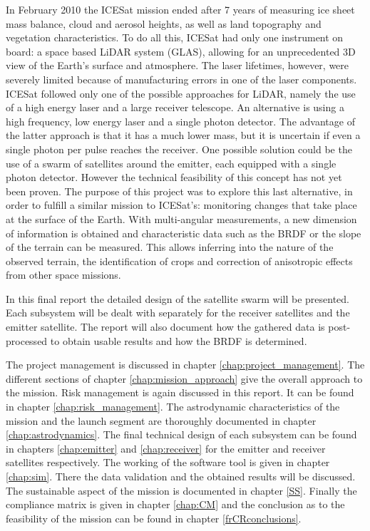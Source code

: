 In February 2010 the ICESat mission ended after 7 years of measuring ice sheet mass balance, cloud and aerosol heights, as well as land topography and vegetation characteristics.
To do all this, ICESat had only one instrument on board: a space based \ac{LiDAR} system (\ac{GLAS}), allowing for an unprecedented 3D view of the Earth's surface and atmosphere.
The laser lifetimes, however, were severely limited because of manufacturing errors in one of the laser components.
ICESat followed only one of the possible approaches for \ac{LiDAR}, namely the use of a high energy laser and a large receiver telescope. An alternative is using a high frequency, low energy laser and a single photon detector. The advantage of the latter approach is that it has a much lower mass, but it is uncertain if even a single photon per pulse reaches the receiver. One possible solution could be the use of a swarm of satellites around the emitter, each equipped with a single photon detector. However the technical feasibility of this concept has not yet been proven.
The purpose of this project was to explore this last alternative, in order to fulfill a similar mission to ICESat's: monitoring changes that take place at the surface of the Earth. With multi-angular measurements, a new dimension of information is obtained and characteristic data such as the \acs{BRDF} or the slope of the terrain can be measured. This allows inferring into the nature of the observed terrain, the identification of crops and correction of anisotropic effects from other space missions.

In this final report the detailed design of the satellite swarm will be presented. Each subsystem will be dealt with separately for the receiver satellites and the emitter satellite. The report will also document how the gathered data is post-processed to obtain usable results and how the \acs{BRDF} is determined.

The project management is discussed in chapter \ref{chap:project_management}. The different sections of chapter \ref{chap:mission_approach} give the overall approach to the mission. Risk management is again discussed in this report. It can be found in chapter \ref{chap:risk_management}. The astrodynamic characteristics of the mission and the launch segment are thoroughly documented in chapter \ref{chap:astrodynamics}. The final technical design of each subsystem can be found in chapters \ref{chap:emitter} and \ref{chap:receiver} for the emitter and receiver satellites respectively.
The working of the software tool is given in chapter \ref{chap:sim}. There the data validation and the obtained results will be discussed. The sustainable aspect of the mission is documented in chapter \ref{SS}. 
Finally the compliance matrix is given in chapter \ref{chap:CM} and the conclusion as to the feasibility of the mission can be found in chapter \ref{frCRconclusions}.

